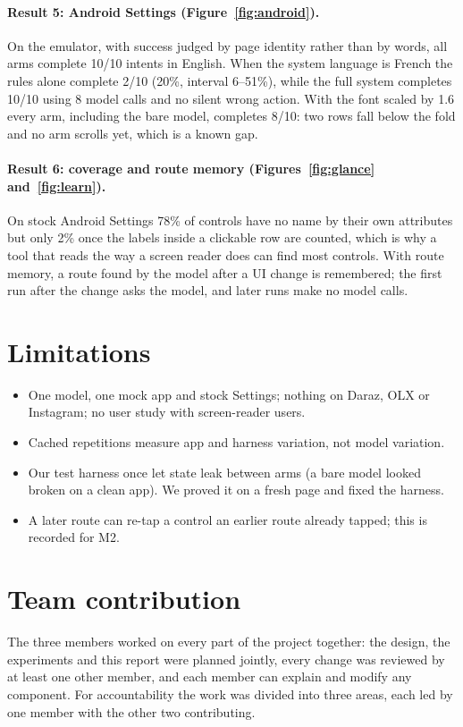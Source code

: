 \documentclass[11pt,a4paper]{article}
\begin{document}
\paragraph{Result 5: Android Settings (Figure~\ref{fig:android}).} On the emulator, with success judged by page identity rather than by words, all arms complete 10/10 intents in English. When the system language is French the rules alone complete 2/10 (20\%, interval 6--51\%), while the full system completes 10/10 using 8 model calls and no silent wrong action. With the font scaled by 1.6 every arm, including the bare model, completes 8/10: two rows fall below the fold and no arm scrolls yet, which is a known gap.

\paragraph{Result 6: coverage and route memory (Figures~\ref{fig:glance} and~\ref{fig:learn}).} On stock Android Settings 78\% of controls have no name by their own attributes but only 2\% once the labels inside a clickable row are counted, which is why a tool that reads the way a screen reader does can find most controls. With route memory, a route found by the model after a UI change is remembered; the first run after the change asks the model, and later runs make no model calls.

\FigInject
\FigVision
\FigLearn
\FigAndroid

\section{Limitations}
\begin{itemize}
\item One model, one mock app and stock Settings; nothing on Daraz, OLX or Instagram; no user study with screen-reader users.
\item Cached repetitions measure app and harness variation, not model variation.
\item Our test harness once let state leak between arms (a bare model looked broken on a clean app). We proved it on a fresh page and fixed the harness.
\item A later route can re-tap a control an earlier route already tapped; this is recorded for M2.
\end{itemize}

\section{Team contribution}\label{sec:team}
The three members worked on every part of the project together: the design, the experiments and this report were planned jointly, every change was reviewed by at least one other member, and each member can explain and modify any component. For accountability the work was divided into three areas, each led by one member with the other two contributing.
\end{document}
